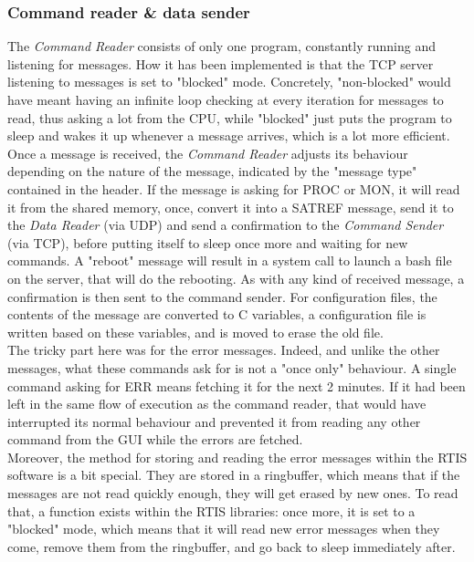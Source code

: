 \documentclass{themeensg}
\begin{document}
\subsubsection{Command reader \& data sender}

The \textit{Command Reader} consists of only one program, constantly running and listening for messages. How it has been implemented is that the TCP server listening to messages is set to "blocked" mode. Concretely, "non-blocked" would have meant having an infinite loop checking at every iteration for messages to read, thus asking a lot from the CPU, while "blocked" just puts the program to sleep and wakes it up whenever a message arrives, which is a lot more efficient.\\

Once a message is received, the \textit{Command Reader} adjusts its behaviour depending on the nature of the message, indicated by the "message type" contained in the header. If the message is asking for PROC or MON, it will read it from the shared memory, once, convert it into a SATREF message, send it to the \textit{Data Reader} (via UDP) and send a confirmation to the \textit{Command Sender} (via TCP), before putting itself to sleep once more and waiting for new commands.
A "reboot" message will result in a system call to launch a bash file on the server, that will do the rebooting. As with any kind of received message, a confirmation is then sent to the command sender. 
For configuration files, the contents of the message are converted to C variables, a configuration file is written based on these variables, and is moved to erase the old file.\\

The tricky part here was for the error messages. Indeed, and unlike the other messages, what these commands ask for is not a "once only" behaviour. A single command asking for ERR means fetching it for the next 2 minutes. If it had been left in the same flow of execution as the command reader, that would have interrupted its normal behaviour and prevented it from reading any other command from the GUI while the errors are fetched.\\
Moreover, the method for storing and reading the error messages within the RTIS software is a bit special. They are stored in a ringbuffer, which means that if the messages are not read quickly enough, they will get erased by new ones. To read that, a function exists within the RTIS libraries: once more, it is set to a "blocked" mode, which means that it will read new error messages when they come, remove them from the ringbuffer, and go back to sleep immediately after.\\
\end{document}
